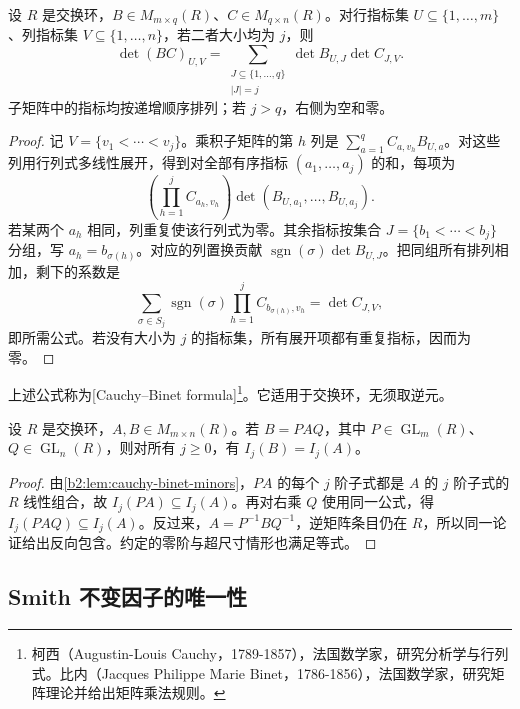 \begin{lemma}\label{b2:lem:cauchy-binet-minors}
	设 \(R\) 是交换环，\(B\in M_{m\times q}(R)\)、\(C\in M_{q\times n}(R)\)。对行指标集 \(U\subseteq\{1,\ldots,m\}\)、列指标集 \(V\subseteq\{1,\ldots,n\}\)，若二者大小均为 \(j\)，则
	\[
		\det(BC)_{U,V} =\sum_{\substack{J\subseteq\{1,\ldots,q\}\\|J|=j}} \det B_{U,J}\det C_{J,V}.
	\]
	子矩阵中的指标均按递增顺序排列；若 \(j>q\)，右侧为空和零。
\end{lemma}
\begin{proof}
	记 \(V=\{v_1<\cdots<v_j\}\)。乘积子矩阵的第 \(h\) 列是 \(\sum_{a=1}^q C_{a,v_h}B_{U,a}\)。对这些列用行列式多线性展开，得到对全部有序指标 \((a_1,\ldots,a_j)\) 的和，每项为
	\[
		\left(\prod_{h=1}^jC_{a_h,v_h}\right) \det(B_{U,a_1},\ldots,B_{U,a_j}).
	\]
	若某两个 \(a_h\) 相同，列重复使该行列式为零。其余指标按集合 \(J=\{b_1<\cdots<b_j\}\) 分组，写 \(a_h=b_{\sigma(h)}\)。对应的列置换贡献 \(\operatorname{sgn}(\sigma)\det B_{U,J}\)。把同组所有排列相加，剩下的系数是
	\[
		\sum_{\sigma\in S_j}\operatorname{sgn}(\sigma) \prod_{h=1}^jC_{b_{\sigma(h)},v_h}=\det C_{J,V},
	\]
	即所需公式。若没有大小为 \(j\) 的指标集，所有展开项都有重复指标，因而为零。
\end{proof}

上述公式称为[Cauchy--Binet formula]\footnote{柯西（Augustin-Louis Cauchy，1789-1857），法国数学家，研究分析学与行列式。比内（Jacques Philippe Marie Binet，1786-1856），法国数学家，研究矩阵理论并给出矩阵乘法规则。}。它适用于交换环，无须取逆元。

\begin{proposition}\label{b2:prop:determinantal-ideal-invariance}
	设 \(R\) 是交换环，\(A,B\in M_{m\times n}(R)\)。若 \(B=PAQ\)，其中 \(P\in\operatorname{GL}_m(R)\)、\(Q\in\operatorname{GL}_n(R)\)，则对所有 \(j\ge0\)，有 \(I_j(B)=I_j(A)\)。
\end{proposition}
\begin{proof}
	由\cref{b2:lem:cauchy-binet-minors}，\(PA\) 的每个 \(j\) 阶子式都是 \(A\) 的 \(j\) 阶子式的 \(R\) 线性组合，故 \(I_j(PA)\subseteq I_j(A)\)。再对右乘 \(Q\) 使用同一公式，得 \(I_j(PAQ)\subseteq I_j(A)\)。反过来，\(A=P^{-1}BQ^{-1}\)，逆矩阵条目仍在 \(R\)，所以同一论证给出反向包含。约定的零阶与超尺寸情形也满足等式。
\end{proof}

\subsection{Smith 不变因子的唯一性}
\label{b2:subsec:0402:02}

